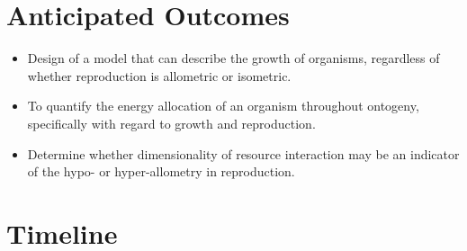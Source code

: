\section*{Anticipated Outcomes}
\begin{itemize}
	\item Design of a model that can describe the growth of organisms, regardless of whether reproduction is allometric or isometric.
	\item  To quantify the energy allocation of an organism throughout ontogeny, specifically with regard to growth and reproduction.
	\item  Determine whether dimensionality of resource interaction may be an indicator of the hypo-  or hyper-allometry in reproduction.
\end{itemize}


\section*{Timeline}


